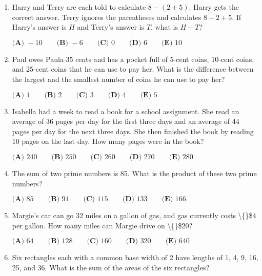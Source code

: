 \documentclass{article}
\begin{document}
\begin{enumerate}[label=\arabic*., itemsep=0.5em]
\item Harry and Terry are each told to calculate \(8 - (2 + 5)\). Harry gets the correct answer. Terry ignores the parentheses and calculates \(8 - 2 + 5\). If Harry's answer is \(H\) and Terry's answer is \(T\), what is \(H - T\)?

\(\textbf{(A) }-10\qquad\textbf{(B) }-6\qquad\textbf{(C) }0\qquad\textbf{(D) }6\qquad \textbf{(E) }10\)\par \vspace{0.5em}\item Paul owes Paula 35 cents and has a pocket full of 5-cent coins, 10-cent coins, and 25-cent coins that he can use to pay her. What is the difference between the largest and the smallest number of coins he can use to pay her?

\(\textbf{(A) }1\qquad\textbf{(B) }2\qquad\textbf{(C) }3\qquad\textbf{(D) }4\qquad \textbf{(E) }5\)\par \vspace{0.5em}\item Isabella had a week to read a book for a school assignment. She read an average of 36 pages per day for the first three days and an average of 44 pages per day for the next three days. She then finished the book by reading 10 pages on the last day. How many pages were in the book?

\(\textbf{(A) }240\qquad\textbf{(B) }250\qquad\textbf{(C) }260\qquad\textbf{(D) }270\qquad \textbf{(E) }280\)\par \vspace{0.5em}\item The sum of two prime numbers is 85. What is the product of these two prime numbers?

\(\textbf{(A) }85\qquad\textbf{(B) }91\qquad\textbf{(C) }115\qquad\textbf{(D) }133\qquad \textbf{(E) }166\)\par \vspace{0.5em}\item Margie's car can go 32 miles on a gallon of gas, and gas currently costs \textbackslash\{\}\$4 per gallon. How many miles can Margie drive on \textbackslash\{\}\$20?

\( \textbf{(A) }64\qquad\textbf{(B) }128\qquad\textbf{(C) }160\qquad\textbf{(D) }320\qquad\textbf{(E) }640 \)\par \vspace{0.5em}\item Six rectangles each with a common base width of 2 have lengths of 1, 4, 9, 16, 25, and 36. What is the sum of the areas of the six rectangles?


\end{enumerate}
\end{document}
